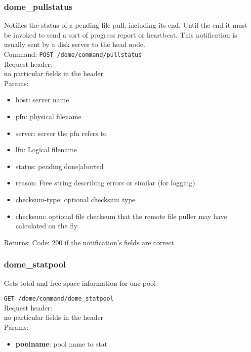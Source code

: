 \documentclass[a4paper,10pt]{scrreprt}
\begin{document}
\subsubsection{dome\_pullstatus}
Notifies the status of a pending file pull, including its end. Until the end it must be invoked to send a sort of progress report or heartbeat.
This notification is usually sent by a disk server to the head node.\\

Command:
\lstinline"POST /dome/command/pullstatus"\\

Request header:\\
no particular fields in the header\\

Params:
\begin{itemize}
 \item host: server name
 \item pfn: physical filename
 \item server: server the pfn refers to
 \item lfn: Logical filename
 \item status: pending|done|aborted

 \item reason: Free string describing errors or similar (for logging)
 \item checksum-type: optional checksum type
 \item checksum: optional file checksum that the remote file puller may have calculated on the fly
\end{itemize}

Returns:
Code: 200 if the notification's fields are correct


\subsubsection{dome\_statpool}
Gets total and free space information for one pool

\lstinline"GET /dome/command/dome_statpool"\\

Request header:\\
 no particular fields in the header\\

Params:
\begin{itemize}
 \item \textbf{poolname}: pool name to stat
\end{itemize}
\end{document}
